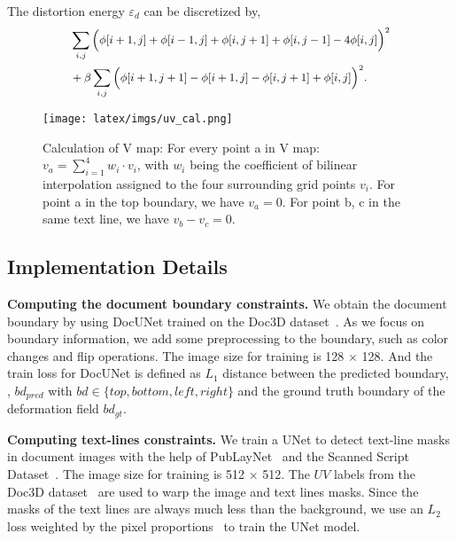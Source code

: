 \documentclass[10pt,twocolumn,letterpaper]{article}
\newcommand{\myparagraph}[1]{\vspace{1pt} \noindent \textbf{#1} }
\begin{document}
The distortion energy $\varepsilon_{d}$ can be discretized by,
\begin{equation}
\small
\begin{aligned}
  & \sum_{i,j} \Big(\phi[i+1,j] + \phi[i-1,j]
  + \phi[i,j+1] + \phi[i,j-1]-4\phi[i,j] \Big)^{2}\\
  & + \beta \sum_{i,j}  \Big(\phi[i+1,j+1] - \phi[i+1,j] - \phi[i,j+1]+\phi[i,j]\Big)^{2}. \\
\end{aligned}
\label{eq:phi2}
\nonumber
\end{equation}
  

\begin{figure}[!t]
  \centering
\texttt{[image: latex/imgs/uv\_cal.png]}

   \caption{Calculation of V map: For every point a in V map: $v_{a}=\sum_{i=1}^{4} w_{i} \cdot v_{i}$, with $w_{i}$ being the coefficient of bilinear interpolation assigned to the four surrounding grid points $v_{i}$. For point a in the top boundary, we have $v_{a} = 0$. For point b, c in the same text line, we have $v_{b} - v_{c} = 0$. }
   \label{fig:uv_cal}
  \vspace{2mm}
\end{figure}


\subsection{Implementation Details}

\myparagraph{Computing the document boundary constraints.} We obtain the document boundary by using DocUNet trained on the Doc3D dataset~\cite{Das_2019_ICCV}. As we focus on boundary information, we add some preprocessing to the boundary, such as color changes and flip operations. The image size for training is 128 $\times$ 128. And the train loss for DocUNet is defined as $L_1$ distance between the predicted boundary, \ie, $bd_{pred}$ with $bd \in \{top, bottom, left, right\}$ and the ground truth boundary of the deformation field $bd_{gt}$. 


\myparagraph{Computing text-lines constraints.}
We train a UNet to detect text-line masks in document images with the help of PubLayNet~\cite{zhong2019publaynet} and the Scanned Script Dataset~\cite{Scanned2019}.
The image size for training is 512 $\times$ 512. The $UV$ labels from the Doc3D dataset~\cite{Das_2019_ICCV} are used to warp the image and text lines masks. 
Since the masks of the text lines are always much less than the background, we use an $L_2$ loss weighted by the pixel proportions~\cite{xue2019learning} to train the UNet model. 
\end{document}
